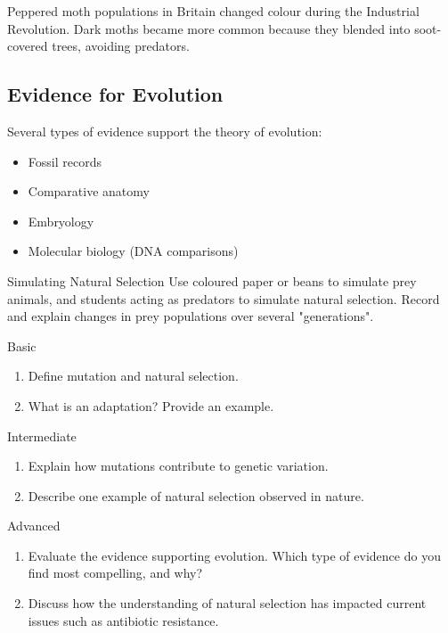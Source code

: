 \begin{example}
Peppered moth populations in Britain changed colour during the Industrial Revolution. Dark moths became more common because they blended into soot-covered trees, avoiding predators.
\end{example}

\subsection{Evidence for Evolution}

Several types of evidence support the theory of evolution:
\begin{itemize}
    \item Fossil records
    \item Comparative anatomy
    \item Embryology
    \item Molecular biology (DNA comparisons)
\end{itemize}

\begin{investigation}{Simulating Natural Selection}
Use coloured paper or beans to simulate prey animals, and students acting as predators to simulate natural selection. Record and explain changes in prey populations over several "generations".
\end{investigation}

\begin{tieredquestions}{Basic}
\begin{enumerate}
    \item Define mutation and natural selection.
    \item What is an adaptation? Provide an example.
\end{enumerate}
\end{tieredquestions}

\begin{tieredquestions}{Intermediate}
\begin{enumerate}
    \item Explain how mutations contribute to genetic variation.
    \item Describe one example of natural selection observed in nature.
\end{enumerate}
\end{tieredquestions}

\begin{tieredquestions}{Advanced}
\begin{enumerate}
    \item Evaluate the evidence supporting evolution. Which type of evidence do you find most compelling, and why?
    \item Discuss how the understanding of natural selection has impacted current issues such as antibiotic resistance.
\end{enumerate}
\end{tieredquestions}

